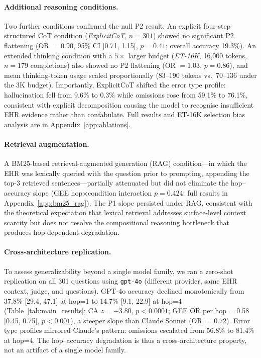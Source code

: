 \documentclass{article}
\begin{document}
\paragraph{Additional reasoning conditions.}
Two further conditions confirmed the null P2 result. An explicit four-step structured CoT condition (\textit{ExplicitCoT}, $n = 301$) showed no significant P2 flattening (OR $= 0.90$, 95\% CI [0.71, 1.15], $p = 0.41$; overall accuracy 19.3\%). An extended thinking condition with a $5\times$ larger budget (\textit{ET-16K}, 16{,}000 tokens, $n = 179$ completions) also showed no P2 flattening (OR $= 1.03$, $p = 0.86$), and mean thinking-token usage scaled proportionally (83--190 tokens vs.\ 70--136 under the 3K budget). Importantly, ExplicitCoT shifted the error type profile: hallucination fell from 9.6\% to 0.3\% while omissions rose from 59.1\% to 76.1\%, consistent with explicit decomposition causing the model to recognise insufficient EHR evidence rather than confabulate. Full results and ET-16K selection bias analysis are in Appendix~\ref{app:ablations}.

\paragraph{Retrieval augmentation.}
A BM25-based retrieval-augmented generation (RAG) condition---in which the EHR was lexically queried with the question prior to prompting, appending the top-3 retrieved sentences---partially attenuated but did not eliminate the hop--accuracy slope (GEE hop$\times$condition interaction $p = 0.424$; full results in Appendix~\ref{app:bm25_rag}). The P1 slope persisted under RAG, consistent with the theoretical expectation that lexical retrieval addresses surface-level context scarcity but does not resolve the compositional reasoning bottleneck that produces hop-dependent degradation.

\paragraph{Cross-architecture replication.}
To assess generalizability beyond a single model family, we ran a zero-shot replication on all 301 questions using \texttt{gpt-4o} (different provider, same EHR context, judge, and questions). GPT-4o accuracy declined monotonically from 37.8\% [29.4, 47.1] at hop=1 to 14.7\% [9.1, 22.9] at hop=4 (Table~\ref{tab:main_results}; CA $z = -3.80$, $p < 0.0001$; GEE OR per hop = 0.58 [0.45, 0.75], $p < 0.001$), a steeper slope than Claude Sonnet (OR $= 0.72$). Error type profiles mirrored Claude's pattern: omissions escalated from 56.8\% to 81.4\% at hop=4. The hop--accuracy degradation is thus a cross-architecture property, not an artifact of a single model family.
\end{document}
